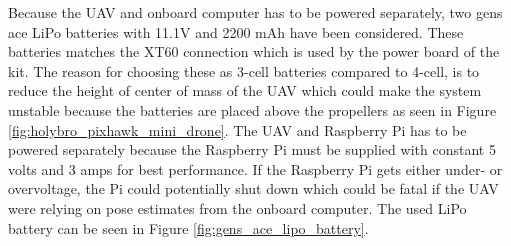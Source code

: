 \documentclass[../Head/report.tex]{subfiles}
\begin{document}
Because the UAV and onboard computer has to be powered separately, two gens ace LiPo batteries with 11.1V and 2200 mAh have been considered. These batteries matches the XT60 connection which is used by the power board of the kit. The reason for choosing these as 3-cell batteries compared to 4-cell, is to reduce the height of center of mass of the UAV which could make the system unstable because the batteries are placed above the propellers as seen in Figure \ref{fig:holybro_pixhawk_mini_drone}. The UAV and Raspberry Pi has to be powered separately because the Raspberry Pi must be supplied with constant 5 volts and 3 amps for best performance. If the Raspberry Pi gets either under- or overvoltage, the Pi could potentially shut down which could be fatal if the UAV were relying on pose estimates from the onboard computer. The used LiPo battery can be seen in Figure \ref{fig:gens_ace_lipo_battery}.  
\end{document}
